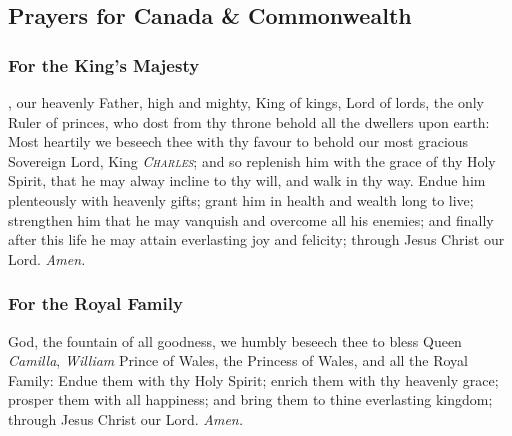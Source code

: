 
\subsection{Prayers for Canada \& Commonwealth}
\subsubsection{For the King's Majesty}
, our heavenly Father, high and mighty, King of kings, Lord of lords, the only Ruler of princes, who dost from thy throne behold all the dwellers upon earth: Most heartily we beseech thee with thy favour to behold our most gracious Sovereign Lord, King \textsc{\textit{Charles}}; and so replenish him with the grace of thy Holy Spirit, that he may alway incline to thy will, and walk in thy way. Endue him plenteously with heavenly gifts; grant him in health and wealth long to live; strengthen him that he may vanquish and overcome all his enemies; and finally after this life he may attain everlasting joy and felicity; through Jesus Christ our Lord. \textit{Amen.}

\subsubsection{For the Royal Family}
 God, the fountain of all goodness, we humbly beseech thee to bless Queen \textit{Camilla}, \textit{William} Prince of Wales, the Princess of Wales, and all the Royal Family: Endue them with thy Holy Spirit; enrich them with thy heavenly grace; prosper them with all happiness; and bring them to thine everlasting kingdom; through Jesus Christ our Lord. \textit{Amen.}

